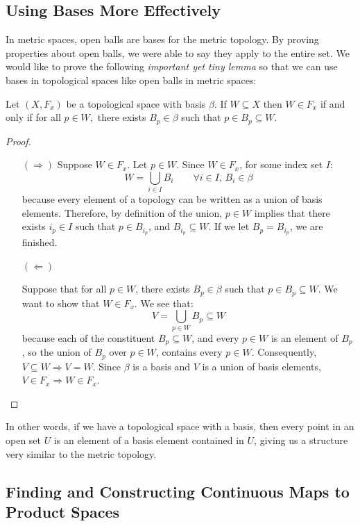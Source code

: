 \subsection{Using Bases More Effectively}

In metric spaces, open balls are bases for the metric topology. By proving properties about open balls, we were able to say they apply to the entire set. We would like to prove the following \emph{important yet tiny lemma} so that we can use bases in topological spaces like open balls in metric spaces: 
\begin{lemma}
	Let $(X,F_x)$ be a topological space with basis $\beta$. If $W\subseteq X$ then $W\in F_x$ if and only if for all $p\in W,$ there exists $B_p\in\beta$ such that $p\in B_p\subseteq W$. 
\end{lemma}
\begin{proof}
	\begin{itemize}
		\item[$(\Rightarrow)$] Suppose $W\in F_x$. Let $p\in W$. Since $W\in F_x$, for some index set $I$:
		\[W = \bigcup_{i\in I}B_i \qquad \forall i\in I,\,B_i\in \beta\]
		because every element of a topology can be written as a union of basis elements. Therefore, by definition of the union, $p\in W$ implies that there exists $i_p\in I$ such that $p\in B_{i_p}$, and $B_{i_p}\subseteq W$. If we let $B_p = B_{i_p}$, we are finished.
		
		\item[$(\Leftarrow)$]
		
		Suppose that for all $p\in W$, there exists $B_p\in \beta$ such that $p\in B_p\subseteq W$. We want to show that $W\in F_x$. We see that:
		\[V = \bigcup_{p\in W}B_p\subseteq W\]
		because each of the constituent $B_p\subseteq W$, and every $p\in W$ is an element of $B_p$, so the union of $B_p$ over $p\in W$, contains every $p\in W$. Consequently, $V\subseteq W \Rightarrow V=W$. Since $\beta$ is a basis and $V$ is a union of basis elements, $V\in F_x \Rightarrow W\in F_x$. 
	\end{itemize}
\end{proof}

In other words, if we have a topological space with a basis, then every point in an open set $U$ is an element of a basis element contained in $U$, giving us a structure very similar to the metric topology.

\subsection{Finding and Constructing Continuous Maps to Product Spaces}

